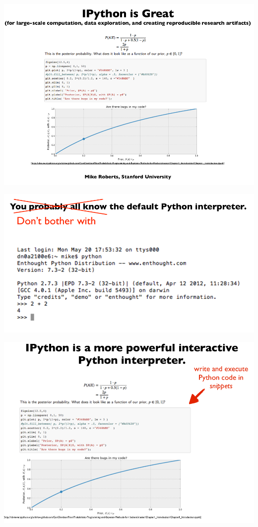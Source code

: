 \documentclass{beamer}
\begin{document}
\begin{frame}{}
    \begin{center}
        \includegraphics[scale=0.3]{ipythonIsGreat.png}
    \end{center}
\end{frame}
\begin{frame}{}
    \begin{center}
        \includegraphics[scale=0.3]{pythonInterpreter.png}
    \end{center}
\end{frame}
\begin{frame}{}
    \begin{center}
        \includegraphics[scale=0.3]{iPythonInterpreter.png}
    \end{center}
\end{frame}
\end{document}
